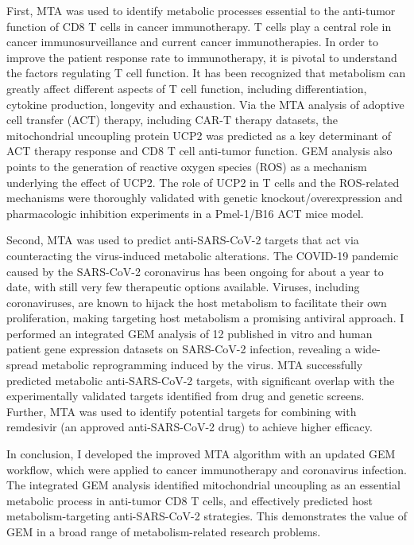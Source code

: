 \documentclass[12pt,twoside,openany,\mydriver]{thesis}  %
\begin{document}
\begin{abstract1}
    \par
    
    First, MTA was used to identify metabolic processes essential to the anti-tumor function of CD8 T cells in cancer immunotherapy. T cells play a central role in cancer immunosurveillance and current cancer immunotherapies. In order to improve the patient response rate to immunotherapy, it is pivotal to understand the factors regulating T cell function. It has been recognized that metabolism can greatly affect different aspects of T cell function, including differentiation, cytokine production, longevity and exhaustion. Via the MTA analysis of adoptive cell transfer (ACT) therapy, including CAR-T therapy datasets, the mitochondrial uncoupling protein UCP2 was predicted as a key determinant of ACT therapy response and CD8 T cell anti-tumor function. GEM analysis also points to the generation of reactive oxygen species (ROS) as a mechanism underlying the effect of UCP2. The role of UCP2 in T cells and the ROS-related mechanisms were thoroughly validated with genetic knockout/overexpression and pharmacologic inhibition experiments in a Pmel-1/B16 ACT mice model.
    
    \par
    
    Second, MTA was used to predict anti-SARS-CoV-2 targets that act via counteracting the virus-induced metabolic alterations. The COVID-19 pandemic caused by the SARS-CoV-2 coronavirus has been ongoing for about a year to date, with still very few therapeutic options available. Viruses, including coronaviruses, are known to hijack the host metabolism to facilitate their own proliferation, making targeting host metabolism a promising antiviral approach. I performed an integrated GEM analysis of 12 published in vitro and human patient gene expression datasets on SARS-CoV-2 infection, revealing a wide-spread metabolic reprogramming induced by the virus. MTA successfully predicted metabolic anti-SARS-CoV-2 targets, with significant overlap with the experimentally validated targets identified from drug and genetic screens. Further, MTA was used to identify potential targets for combining with remdesivir (an approved anti-SARS-CoV-2 drug) to achieve higher efficacy.
    
    \par
    
    In conclusion, I developed the improved MTA algorithm with an updated GEM workflow, which were applied to cancer immunotherapy and coronavirus infection. The integrated GEM analysis identified mitochondrial uncoupling as an essential metabolic process in anti-tumor CD8 T cells, and effectively predicted host metabolism-targeting anti-SARS-CoV-2 strategies. This demonstrates the value of GEM in a broad range of metabolism-related research problems.
  \end{abstract1}
\end{document}
